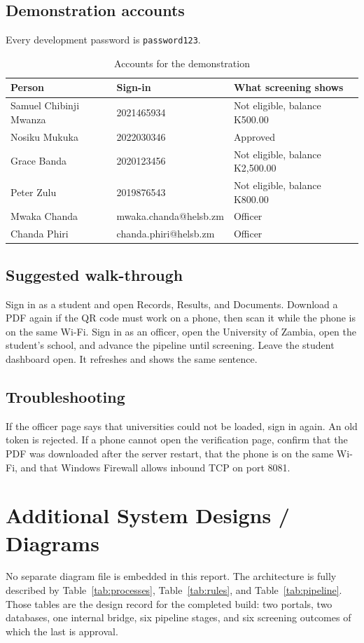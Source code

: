 \documentclass[12pt,a4paper]{report}
\begin{document}
\section*{Demonstration accounts}
Every development password is \texttt{password123}.

\begin{table}[H]
\centering
\caption{Accounts for the demonstration}
\begin{tabular}{p{}p{}p{}}
\toprule
Person & Sign-in & What screening shows\\
\midrule
Samuel Chibinji Mwanza & 2021465934 & Not eligible, balance K500.00\\
Nosiku Mukuka & 2022030346 & Approved\\
Grace Banda & 2020123456 & Not eligible, balance K2,500.00\\
Peter Zulu & 2019876543 & Not eligible, balance K800.00\\
Mwaka Chanda & mwaka.chanda@helsb.zm & Officer\\
Chanda Phiri & chanda.phiri@helsb.zm & Officer\\
\bottomrule
\end{tabular}
\end{table}

\section*{Suggested walk-through}
Sign in as a student and open Records, Results, and Documents. Download a PDF again if the QR code must work on a phone, then scan it while the phone is on the same Wi-Fi. Sign in as an officer, open the University of Zambia, open the student's school, and advance the pipeline until screening. Leave the student dashboard open. It refreshes and shows the same sentence.

\section*{Troubleshooting}
If the officer page says that universities could not be loaded, sign in again. An old token is rejected. If a phone cannot open the verification page, confirm that the PDF was downloaded after the server restart, that the phone is on the same Wi-Fi, and that Windows Firewall allows inbound TCP on port 8081.

\chapter{Additional System Designs / Diagrams}
No separate diagram file is embedded in this report. The architecture is fully described by Table~\ref{tab:processes}, Table~\ref{tab:rules}, and Table~\ref{tab:pipeline}. Those tables are the design record for the completed build: two portals, two databases, one internal bridge, six pipeline stages, and six screening outcomes of which the last is approval.
\end{document}
